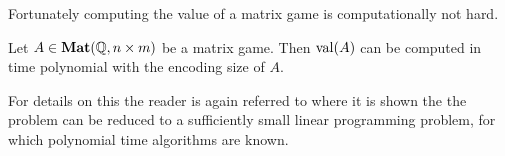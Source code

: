 Fortunately computing the value of a matrix game is computationally not hard.
\begin{prop}
  Let $A \in \mathbf{Mat}(\mathbb{Q}, n \times m)$ be a matrix game. Then 
  $\mathrm{val}(A)$ can be computed in time polynomial with the encoding size of $A$.
\end{prop}
For details on this the reader is again referred to \citep[Chapter 15]{matrixGamesChvatal} where
it is shown the the problem can be reduced to a sufficiently small linear programming problem,
for which polynomial time algorithms are known.
